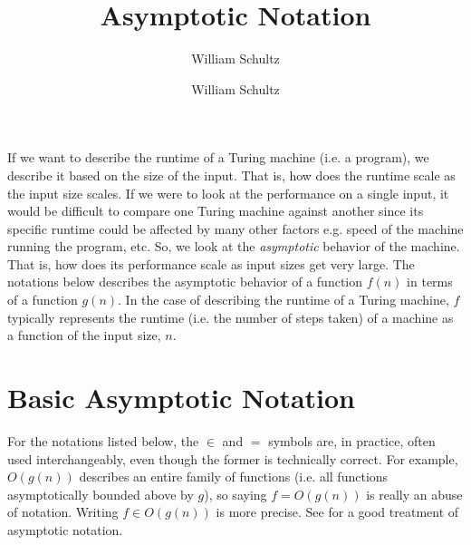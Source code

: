 \documentclass[10pt,a4paper]{article}
\author{William Schultz}
\begin{document}
\title{Asymptotic Notation}
\author{William Schultz}
\maketitle
 
If we want to describe the runtime of a Turing machine (i.e. a program), we describe it based on the size of the input. That is, how does the runtime scale as the input size scales. If we were to look at the performance on a single input, it would be difficult to compare one Turing machine against another since its specific runtime could be affected by many other factors e.g. speed of the machine running the program, etc. So, we look at the \textit{asymptotic} behavior of the machine. That is, how does its performance scale as input sizes get very large. The notations below describes the asymptotic behavior of a function $f(n)$ in terms of a function $g(n)$. In the case of describing the runtime of a Turing machine, $f$ typically represents the runtime (i.e. the number of steps taken) of a machine as a function of the input size, $n$.

\section*{Basic Asymptotic Notation}

For the notations listed below, the $\in$ and $=$ symbols are, in practice, often used interchangeably, even though the former is technically correct. For example, $O(g(n))$ describes an entire family of functions (i.e. all functions asymptotically bounded above by $g$), so saying $f = O(g(n))$ is really an abuse of notation. Writing $f \in O(g(n))$ is more precise. See \cite{graham1989concrete} for a good treatment of asymptotic notation.
\end{document}

